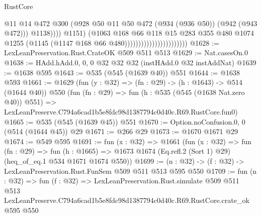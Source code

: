 \begin{lexlean}{RustCore}
\begin{coremodule}
                                                      @11
                                                      @14
                                                      @472
                                                      @300
                                                      (@928
                                                        @50
                                                        @11
                                                        @50
                                                        @472
                                                        (@934 (@936 @50))
                                                        (@942 (@943 @472)))
                                                      @1138))))
                                              @1151)
                                            (@1063
                                              @168
                                              @66
                                              @118
                                              @15
                                              @283
                                              @355
                                              @480
                                              @1074
                                              @1255
                                              (@1145 (@1147 @168 @66 @480)))))))))))))))))))))))
@1628 := LexLeanPreservation.Rust.CrateOK @509 @511 @513
@1629 := Nat.casesOn.{0}
@1638 := HAdd.hAdd.{0, 0, 0} @32 @32 @32 (instHAdd.{0} @32 instAddNat)
@1639 := @1638 @595
@1643 := @535 (@545 (@1639 @40)) @551
@1644 := @1638 @593
@1661 := @1629
    (fun (y : @32) => (fn : @29) -> (h : @1643) -> @514 (@1644 @40))
    @550
    (fun (fn : @29) =>
    fun (h : @535 (@545 (@1638 Nat.zero @40)) @551) =>
    LexLeanPreserve.C794a6cad1b5e8fdc98d1387794c0d40c.R69.RustCore.fun0)
@1665 := @535 (@545 (@1639 @45)) @551
@1670 := Option.noConfusion.{0, 0} (@514 (@1644 @45)) @29
@1671 := @266 @29
@1673 := @1670 @1671 @29
@1674 := @549 @595
@1691 := fun (x : @32) =>
  @1661
    (fun (x : @32) =>
    fun (fn : @29) =>
    fun (h : @1665) => @1673 @1674 (Eq.refl.{2} (Sort 1) @29) (heq_of_eq.{1} @534 @1671 @1674 @550))
@1699 := (n : @32) -> (f : @32) -> LexLeanPreservation.Rust.FunSem @509 @511 @513 @595 @550
@1709 := fun (n : @32) =>
  fun (f : @32) =>
  LexLeanPreservation.Rust.simulate
    @509
    @511
    @513
    LexLeanPreserve.C794a6cad1b5e8fdc98d1387794c0d40c.R69.RustCore.crate_ok
    @595
    @550
\end{coremodule}
\end{lexlean}
